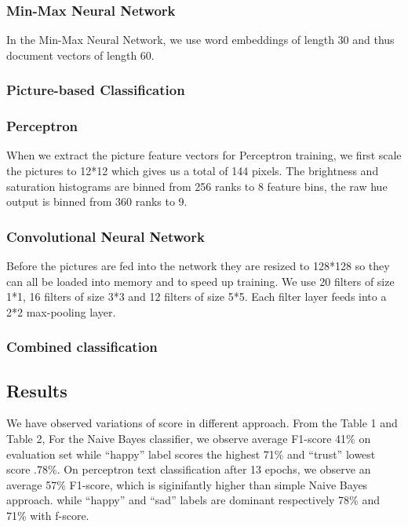 \documentclass[11pt]{article}
\begin{document}
\subsubsection*{Min-Max Neural Network}
In the Min-Max Neural Network, we use word embeddings of length 30 and thus
document vectors of length 60.

\subsubsection{Picture-based Classification}
\subsubsection*{Perceptron}
When we extract the picture feature vectors for Perceptron training, we first
scale the pictures to 12*12 which gives us a total of 144 pixels.
The brightness and saturation histograms are binned from 256 ranks to 8 feature
bins, the raw hue output is binned from 360 ranks to 9.

\subsubsection*{Convolutional Neural Network}
Before the pictures are fed into the network they are resized to 128*128 so they
can all be loaded into memory and to speed up training.
We use 20 filters of size 1*1, 16 filters of size 3*3 and 12 filters of size
5*5.
Each filter layer feeds into a 2*2 max-pooling layer.

\subsubsection{Combined classification}

\subsection{Results}
\label{ssec:results}

We have observed variations of score in different approach. From the Table 1 and Table 2, For the Naive Bayes classifier, we observe average F1-score 41\% on evaluation set while ``happy'' label scores the highest  71\% and ``trust'' lowest score .78\%. On perceptron text classification after 13 epochs, we observe an average 57\% F1-score, which is siginifantly higher than simple Naive Bayes approach. while ``happy'' and ``sad'' labels are dominant respectively 78\% and 71\% with f-score.
\end{document}
